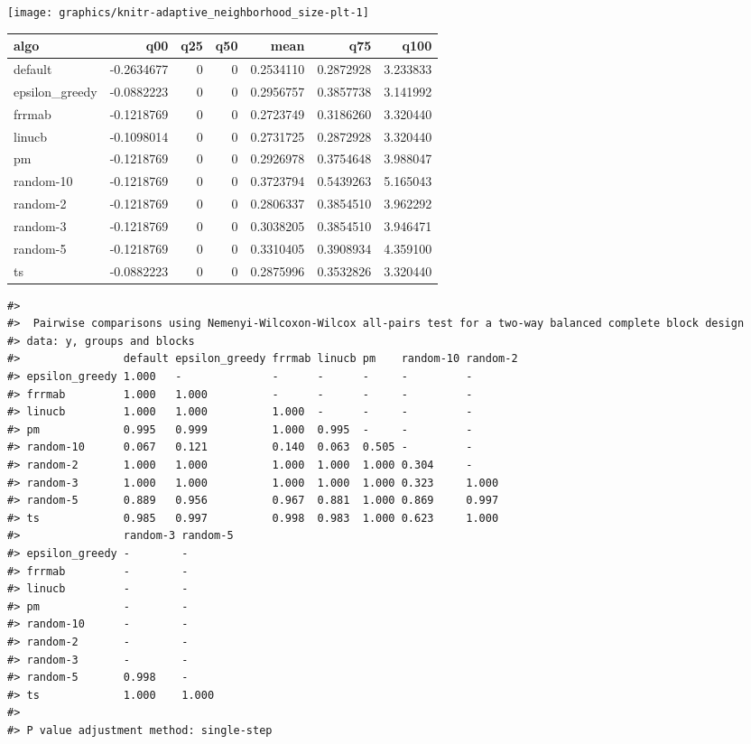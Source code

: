 \documentclass[
]{article}
\begin{document}
\begin{center}\texttt{[image: graphics/knitr-adaptive\_neighborhood\_size-plt-1]} \end{center}

\begin{longtable}[]{@{}lrrrrrr@{}}
\toprule
algo & q00 & q25 & q50 & mean & q75 & q100 \\
\midrule
\endhead
default & -0.2634677 & 0 & 0 & 0.2534110 & 0.2872928 & 3.233833 \\
epsilon\_greedy & -0.0882223 & 0 & 0 & 0.2956757 & 0.3857738 &
3.141992 \\
frrmab & -0.1218769 & 0 & 0 & 0.2723749 & 0.3186260 & 3.320440 \\
linucb & -0.1098014 & 0 & 0 & 0.2731725 & 0.2872928 & 3.320440 \\
pm & -0.1218769 & 0 & 0 & 0.2926978 & 0.3754648 & 3.988047 \\
random-10 & -0.1218769 & 0 & 0 & 0.3723794 & 0.5439263 & 5.165043 \\
random-2 & -0.1218769 & 0 & 0 & 0.2806337 & 0.3854510 & 3.962292 \\
random-3 & -0.1218769 & 0 & 0 & 0.3038205 & 0.3854510 & 3.946471 \\
random-5 & -0.1218769 & 0 & 0 & 0.3310405 & 0.3908934 & 4.359100 \\
ts & -0.0882223 & 0 & 0 & 0.2875996 & 0.3532826 & 3.320440 \\
\bottomrule
\end{longtable}

\begin{verbatim}
#> 
#>  Pairwise comparisons using Nemenyi-Wilcoxon-Wilcox all-pairs test for a two-way balanced complete block design
#> data: y, groups and blocks
#>                default epsilon_greedy frrmab linucb pm    random-10 random-2
#> epsilon_greedy 1.000   -              -      -      -     -         -       
#> frrmab         1.000   1.000          -      -      -     -         -       
#> linucb         1.000   1.000          1.000  -      -     -         -       
#> pm             0.995   0.999          1.000  0.995  -     -         -       
#> random-10      0.067   0.121          0.140  0.063  0.505 -         -       
#> random-2       1.000   1.000          1.000  1.000  1.000 0.304     -       
#> random-3       1.000   1.000          1.000  1.000  1.000 0.323     1.000   
#> random-5       0.889   0.956          0.967  0.881  1.000 0.869     0.997   
#> ts             0.985   0.997          0.998  0.983  1.000 0.623     1.000   
#>                random-3 random-5
#> epsilon_greedy -        -       
#> frrmab         -        -       
#> linucb         -        -       
#> pm             -        -       
#> random-10      -        -       
#> random-2       -        -       
#> random-3       -        -       
#> random-5       0.998    -       
#> ts             1.000    1.000
#> 
#> P value adjustment method: single-step
\end{verbatim}
\end{document}
